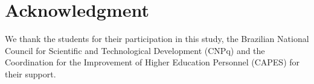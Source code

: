 \section*{Acknowledgment}
\label{sec:acknowledgment}

We thank the students for their participation in this study, the Brazilian
National Council for Scientific and Technological Development (CNPq) and the
Coordination for the Improvement of Higher Education Personnel (CAPES) for
their support.
